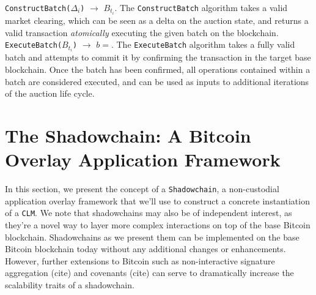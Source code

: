 \documentclass[10pt,a4paper]{article}
\theoremstyle{definition}
\begin{document}
\texttt{ConstructBatch($\Delta_i$)} $\rightarrow$ $B_{t_i}$. The
\texttt{ConstructBatch} algorithm takes a valid market clearing, which can be
seen as a delta on the auction state, and returns a valid transaction
\emph{atomically} executing the given batch on the blockchain. \\

\texttt{ExecuteBatch($B_{t_i}$)} $\rightarrow$ $b=$. The \texttt{ExecuteBatch}
algorithm takes a fully valid batch and attempts to commit it by confirming the
transaction in the target base blockchain. Once the batch has been confirmed,
all operations contained within a batch are considered executed, and can be
used as inputs to additional iterations of the auction life cycle.




\iffalse
shadow chain section:
  * define as state machine that returns tate, then later define state in specific section to the the input of all the utxos and other state

 ShadowChain:
    * Init() -> lambda params, w/e w/e
    * state = InitState(auctioneerUtxo)
    * state = stateStep(state, stateDelta) -- a qurom needed to state step,
    * propose set of updates to all
        * for account := range accounts {
            proopse state
         }
     * state_i = UpgradeState(state_i)
     * state = {operatorKey, k_1, .., k_n}
     * state = stateFunc(state, proposal, executionEnv)
          * env can change off-chain, no need to on-chain upgrades, identified by hash/identifier
     * order of execution func as way to impl soft-forks?
     * state = coasalce(state_,1, ..., state_n) (transaction cut thru)
     * quorum = propose(masterKey, accounts)
     * ^ then state func
\fi

\section{The Shadowchain: A Bitcoin Overlay Application Framework}

In this section, we present the concept of a \texttt{Shadowchain}, a
non-custodial application overlay framework that we'll use to construct a
concrete instantiation of a \texttt{CLM}. We note that shadowchains may also be
of independent interest, as they're a novel way to layer more complex
interactions on top of the base Bitcoin blockchain. Shadowchains as we present
them can be implemented on the base Bitcoin blockchain today without any
additional changes or enhancements. However, further extensions to Bitcoin such
as non-interactive signature aggregation (cite) and covenants (cite) can serve
to dramatically increase the scalability traits of a shadowchain.
\end{document}
